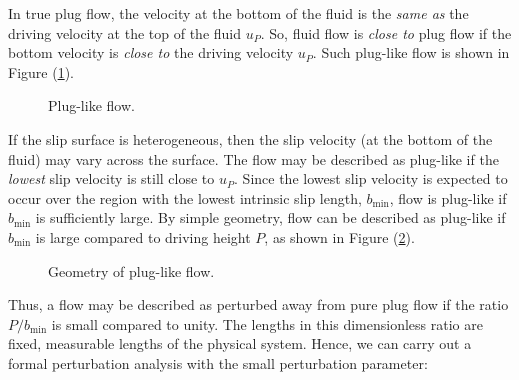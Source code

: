 \documentclass[12pt, a4paper, twoside, openright]{book}
\newcommand{\bmin}{\ensuremath{b_{\mathrm{min}}}}
\begin{document}
In true plug flow, the velocity at the bottom of the fluid is the \emph{same as} the driving velocity at the top of the fluid $u_P$.  So, fluid flow is \emph{close to} plug flow if the bottom velocity is \emph{close to} the driving  velocity $u_P$.
Such plug-like flow is shown in Figure (\ref{pluglike}).

\begin{figure}[ht]
\centering
{}
\caption{Plug-like flow.} \label{pluglike}
\end{figure}

If the slip surface is heterogeneous, then the slip velocity (at the bottom of the fluid) may vary across the surface.  The flow may be described as plug-like if the \emph{lowest} slip velocity is still close to $u_P$.  Since the lowest slip velocity is expected to occur over the region with the lowest intrinsic slip length, $\bmin$, flow is plug-like if $\bmin$ is sufficiently large.  By simple geometry, flow can be described as plug-like if $\bmin$ is large compared to driving height $P$, as shown in Figure (\ref{geometry}).

\begin{figure}[ht]
\centering
{}
\caption{Geometry of plug-like flow.} \label{geometry}
\end{figure}

Thus, a flow may be described as perturbed away from pure plug flow if the ratio $P/ \bmin$ is small compared to unity.  The lengths in this dimensionless ratio are fixed, measurable lengths of the physical system.  Hence, we can carry out a formal perturbation analysis with the small perturbation parameter:
\end{document}
